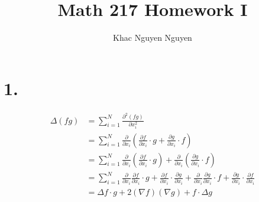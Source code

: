 \documentclass[11pt]{article}
\title{\textbf{Math 217 Homework I}}
\author{Khac Nguyen Nguyen}
\date{}
\begin{document}
\section*{1.}
\begin{equation*}
\begin{aligned}
\Delta(fg) &= \sum_{i=1}^N \frac{\partial^2(fg)}{\partial x_i^2} \\
&= \sum_{i=1}^N \frac{\partial}{\partial x_i} \left( \frac{\partial f}{\partial x_i} \cdot g + \frac{\partial g}{\partial x_i} \cdot f \right) \\
&= \sum_{i=1}^N \frac{\partial}{\partial x_i} \left( \frac{\partial f}{\partial x_i} \cdot g \right) + \frac{\partial}{\partial x_i} \left(\frac{\partial g}{\partial x_i} \cdot f \right) \\
&= \sum_{i=1}^N \frac{\partial}{\partial x_i} \frac{\partial f}{\partial x_i} \cdot g + \frac{\partial f}{\partial x_i} \cdot \frac{\partial g}{\partial x_i}  + \frac{\partial}{\partial x_i} \frac{\partial g}{\partial x_i} \cdot f + \frac{\partial g}{\partial x_i} \cdot \frac{\partial f}{\partial x_i} \\
&= \Delta f \cdot g + 2 (\nabla f)(\nabla g) + f \cdot \Delta g 
\end{aligned}
\end{equation*}
\pagebreak
\end{document}
